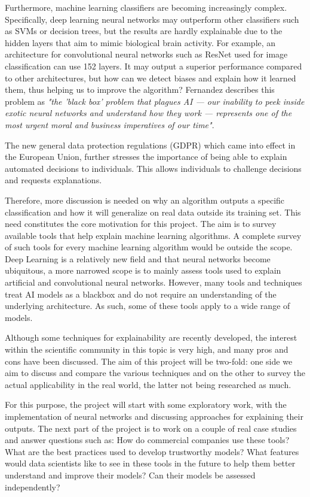 \documentclass[proposal]{softeng}
\begin{document}
    Furthermore, machine learning classifiers are becoming increasingly complex. Specifically, deep learning neural networks may outperform other classifiers such as SVMs or decision trees, but the results are hardly explainable due to the hidden layers that aim to mimic biological brain activity. For example, an architecture for convolutional neural networks such as ResNet\cite{res-net} used for image classification can use 152 layers. It may output a superior performance compared to other architectures, but how can we detect biases and explain how it learned them, thus helping us to improve the algorithm? Fernandez\cite{fernandez-dark-ai} describes this problem as \textit{"the 'black box' problem that plagues AI — our inability to peek inside exotic neural networks and understand how they work — represents one of the most urgent moral and business imperatives of our time"}.

    The new general data protection regulations (GDPR) which came into effect in the European Union, further stresses the importance of being able to explain automated decisions to individuals. This allows individuals to challenge decisions \cite{GoodmanB2017EUro, gdpr} and requests explanations.

    Therefore, more discussion is needed on why an algorithm outputs a specific classification and how it will generalize on real data outside its training set. This need constitutes the core motivation for this project. The aim is to survey available tools that help explain machine learning algorithms. A complete survey of such tools for every machine learning algorithm would be outside the scope. Deep Learning is a relatively new field and that neural networks become ubiquitous, a more narrowed scope is to mainly assess tools used to explain artificial and convolutional neural networks. However, many tools and techniques treat AI models as a blackbox and do not require an understanding of the underlying architecture. As such, some of these tools apply to a wide range of models.

    Although some techniques for explainability are recently developed, the interest within the scientific community in this topic is very high, and many pros and cons have been discussed. The aim of this project will be two-fold: one side we aim to discuss and compare the various techniques and on the other to survey the actual applicability in the real world, the latter not being researched as much.

    For this purpose, the project will start with some exploratory work, with the implementation of neural networks and discussing approaches for explaining their outputs. The next part of the project is to work on a couple of real case studies and answer questions such as: How do commercial companies use these tools? What are the best practices used to develop trustworthy models? What features would data scientists like to see in these tools in the future to help them better understand and improve their models? Can their models be assessed independently?
\end{document}
